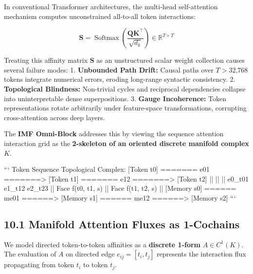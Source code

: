 \documentclass[11pt,twoside,openright]{amsbook}
\begin{document}
{{{{{{In conventional Transformer architectures, the multi-head self-attention mechanism computes unconstrained all-to-all token interactions:

$$\mathbf{S} = \operatorname{Softmax}\left( \frac{\mathbf{Q}\mathbf{K}^\top}{\sqrt{d_k}} \right) \in \mathbb{R}^{T \times T}$$

Treating this affinity matrix $\mathbf{S}$ as an unstructured scalar weight collection causes several failure modes:
1. \textbf{Unbounded Path Drift:} Causal paths over $T > 32\text{,}768$ tokens integrate numerical errors, eroding long-range syntactic consistency.
2. \textbf{Topological Blindness:} Non-trivial cycles and reciprocal dependencies collapse into uninterpretable dense superpositions.
3. \textbf{Gauge Incoherence:} Token representations rotate arbitrarily under feature-space transformations, corrupting cross-attention across deep layers.

The \textbf{IMF Omni-Block} addresses this by viewing the sequence attention interaction grid as the \textbf{2-skeleton of an oriented discrete manifold complex} $K$.

```
Token Sequence Topological Complex:
  [Token t0] ======= e01 =======> [Token t1] ======= e12 =======> [Token t2]
      ||                             ||                             ||
     e0_t01                         e1_t12                         e2_t23
      ||      Face f(t0, t1, s)      ||      Face f(t1, t2, s)      ||
      \/                             \/                             \/
  [Memory s0] ====== me01 ======> [Memory s1] ====== me12 ======> [Memory s2]
```

\subsection{10.1 Manifold Attention Fluxes as 1-Cochains}

We model directed token-to-token affinities as a \textbf{discrete 1-form} $A \in C^1(K)$. The evaluation of $A$ on directed edge $e_{ij} = [t_i, t_j]$ represents the interaction flux propagating from token $t_i$ to token $t_j$.

}}}}}}
\end{document}
